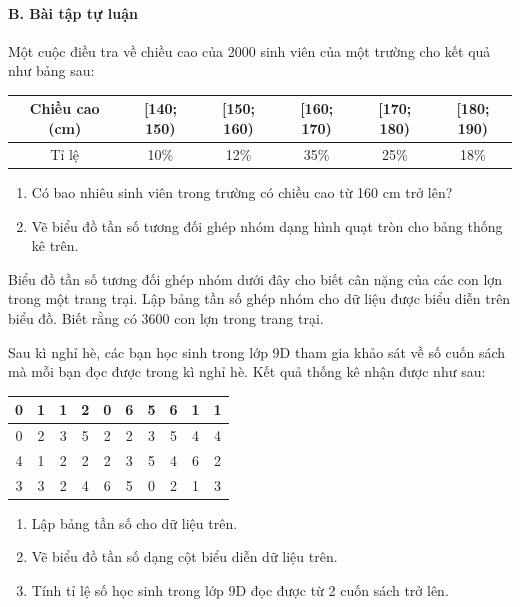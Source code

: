 \documentclass[%
    fontsize=12pt,%
    chapterprefix=false,%
    open=right,%
    twoside=false,%
    numbers=noenddot,%
    headings=optiontohead,%
    final,%
    DIV=15,%
    parskip=half %
]{scrbook}
\begin{document}
\paragraph{B. Bài tập tự luận}

\begin{tuluan}

\item Một cuộc điều tra về chiều cao của 2000 sinh viên của một trường cho kết quả như bảng sau: \begin{tabular}{|c|c|c|c|c|c|} \hline Chiều cao (cm) & [140; 150) & [150; 160) & [160; 170) & [170; 180) & [180; 190) \\ \hline Tỉ lệ & 10\% & 12\% & 35\% & 25\% & 18\% \\ \hline \end{tabular}
\begin{enumerate}[label=\alph*)]
  \item[a)] Có bao nhiêu sinh viên trong trường có chiều cao từ 160 cm trở lên?
  \item[b)] Vẽ biểu đồ tần số tương đối ghép nhóm dạng hình quạt tròn cho bảng thống kê trên.
\end{enumerate}

\item Biểu đồ tần số tương đối ghép nhóm dưới đây cho biết cân nặng của các con lợn trong một trang trại. Lập bảng tần số ghép nhóm cho dữ liệu được biểu diễn trên biểu đồ. Biết rằng có 3600 con lợn trong trang trại.

\item Sau kì nghỉ hè, các bạn học sinh trong lớp 9D tham gia khảo sát về số cuốn sách mà mỗi bạn đọc được trong kì nghỉ hè. Kết quả thống kê nhận được như sau: \begin{tabular}{|c|c|c|c|c|c|c|c|c|c|} \hline 0 & 1 & 1 & 2 & 0 & 6 & 5 & 6 & 1 & 1 \\ \hline 0 & 2 & 3 & 5 & 2 & 2 & 3 & 5 & 4 & 4 \\ \hline 4 & 1 & 2 & 2 & 2 & 3 & 5 & 4 & 6 & 2 \\ \hline 3 & 3 & 2 & 4 & 6 & 5 & 0 & 2 & 1 & 3 \\ \hline \end{tabular}
\begin{enumerate}[label=\alph*)]
  \item[a)] Lập bảng tần số cho dữ liệu trên.
  \item[b)] Vẽ biểu đồ tần số dạng cột biểu diễn dữ liệu trên.
  \item[c)] Tính tỉ lệ số học sinh trong lớp 9D đọc được từ 2 cuốn sách trở lên.
\end{enumerate}


\end{tuluan}
\end{document}
